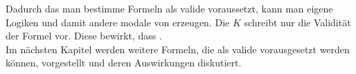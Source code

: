 Dadurch das man bestimme Formeln als valide voraussetzt, kann man eigene Logiken und damit andere modale von \true erzeugen.
Die \NML $K$ schreibt nur die Validität der Formel \KFormel vor.
Diese bewirkt, dass .\\
Im nächsten Kapitel werden weitere Formeln, die als valide vorausgesetzt werden können, vorgestellt und deren Auswirkungen diskutiert.







